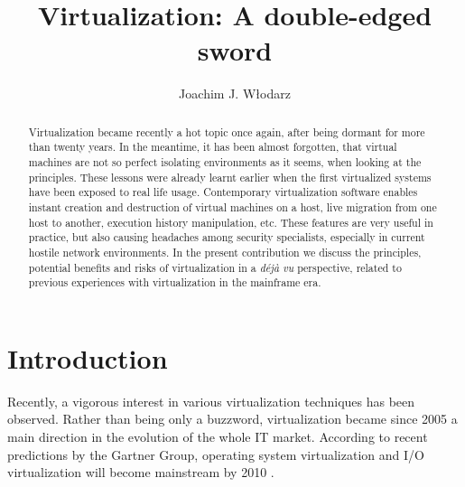 \documentclass[11pt,a4paper]{llncs}
\begin{document}
\title{ Virtualization: A double-edged sword } 
\author{ Joachim J. W{\l}odarz }
\maketitle
\begin{abstract} 
Virtualization became recently a hot topic once again, after being dormant
for more than twenty years. In the meantime, it has been almost forgotten, 
that virtual machines are not so perfect isolating environments as it seems, 
when looking at the principles. These lessons were already learnt earlier 
when the first virtualized systems have been exposed to real life usage.  
Contemporary virtualization software enables instant creation and destruction
of virtual machines on a host, live migration from one host to another,
execution history manipulation, etc. These features are very useful in
practice, but also causing headaches among security specialists, especially
in current hostile network environments.
In the present contribution we discuss the principles, potential benefits 
and risks of virtualization in a {\em d{\'e}j{\`a} vu} perspective, related
to previous experiences with virtualization in the mainframe era. 

\end{abstract}




\section{ Introduction }


Recently, a vigorous  interest in various virtualization techniques has been 
observed. Rather than being only a buzzword, virtualization became since 2005 
a main direction in the evolution of the whole IT market. According to 
recent predictions by the Gartner Group, operating system virtualization and 
I/O virtualization will become mainstream by 2010 \cite{GGP}.
\end{document}

